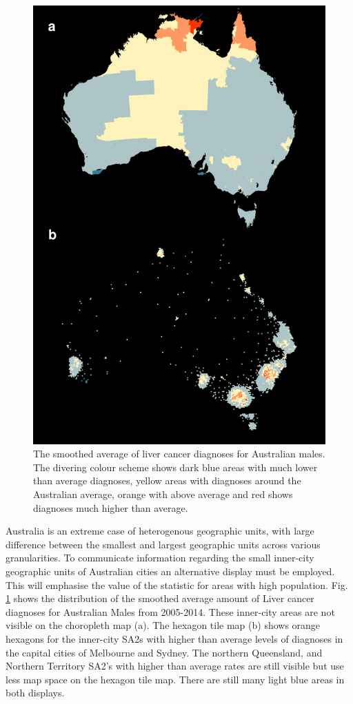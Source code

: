 \documentclass[conference,final,]{IEEEtran}
\makeatletter
\def\maxwidth{\ifdim\Gin@nat@width>\linewidth\linewidth
\else\Gin@nat@width\fi}
\let\Oldincludegraphics\includegraphics
\renewcommand{\includegraphics}[1]{\Oldincludegraphics[width=\maxwidth]{#1}}
\makeatother
\begin{document}
\begin{figure}
\centering
\includegraphics{paper_files/figure-latex/liver-1.pdf}
\caption{\label{fig:liver}The smoothed average of liver cancer diagnoses for Australian males. The divering colour scheme shows dark blue areas with much lower than average diagnoses, yellow areas with diagnoses around the Australian average, orange with above average and red shows diagnoses much higher than average.}
\end{figure}

Australia is an extreme case of heterogenous geographic units, with large difference between the smallest and largest geographic units across various granularities.
To communicate information regarding the small inner-city geographic units of Australian cities an alternative display must be employed. This will emphasise the value of the statistic for areas with high population. Fig. \ref{fig:liver} shows the distribution of the smoothed average amount of Liver cancer diagnoses for Australian Males from 2005-2014.
These inner-city areas are not visible on the choropleth map (a). The hexagon tile map (b) shows orange hexagons for the inner-city SA2s with higher than average levels of diagnoses in the capital cities of Melbourne and Sydney. The northern Queensland, and Northern Territory SA2's with higher than average rates are still visible but use less map space on the hexagon tile map. There are still many light blue areas in both displays.
\end{document}
